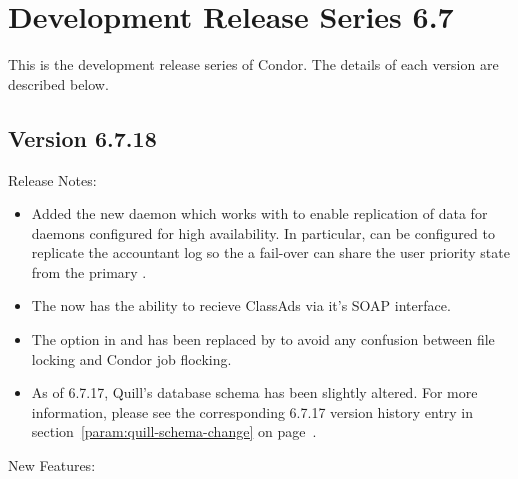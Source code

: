 \section{\label{sec:History-6-7}Development Release Series 6.7}

This is the development release series of Condor.
The details of each version are described below.

\subsection*{\label{sec:New-6-7.18}Version 6.7.18}

\noindent Release Notes:

\begin{itemize}

\item Added the new  daemon which works with
   to enable replication of data for daemons configured
  for high availability.  In particular,  can be
  configured to replicate the accountant log so the a fail-over
   can share the user priority state from the
  primary .

\item The  now has the ability to recieve ClassAds
  via it's SOAP interface.

\item The  option in  and
   has been replaced by  to avoid
  any confusion between file locking and Condor job flocking.

\item As of 6.7.17, Quill's database schema has been slightly altered. 
For more information, please see the corresponding 6.7.17 version history entry in 
section~\ref{param:quill-schema-change} on page~\pageref{param:quill-schema-change}.

\end{itemize}

\noindent New Features:

